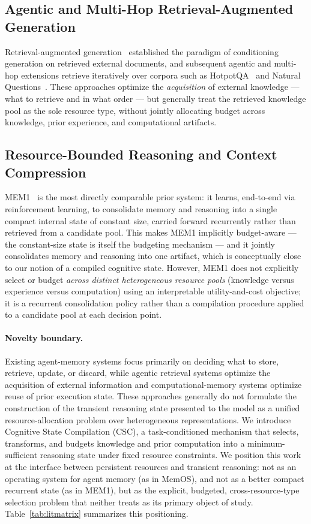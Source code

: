 \documentclass{article}
\begin{document}
\subsection{Agentic and Multi-Hop Retrieval-Augmented Generation}
Retrieval-augmented generation~\citep{lewis2020rag} established the paradigm of conditioning generation on retrieved external documents, and subsequent agentic and multi-hop extensions retrieve iteratively over corpora such as HotpotQA~\citep{yang2018hotpotqa} and Natural Questions~\citep{kwiatkowski2019natural}. These approaches optimize the \emph{acquisition} of external knowledge --- what to retrieve and in what order --- but generally treat the retrieved knowledge pool as the sole resource type, without jointly allocating budget across knowledge, prior experience, and computational artifacts.

\subsection{Resource-Bounded Reasoning and Context Compression}
MEM1~\citep{zhou2025mem1} is the most directly comparable prior system: it learns, end-to-end via reinforcement learning, to consolidate memory and reasoning into a single compact internal state of constant size, carried forward recurrently rather than retrieved from a candidate pool. This makes MEM1 implicitly budget-aware --- the constant-size state is itself the budgeting mechanism --- and it jointly consolidates memory and reasoning into one artifact, which is conceptually close to our notion of a compiled cognitive state. However, MEM1 does not explicitly select or budget \emph{across distinct heterogeneous resource pools} (knowledge versus experience versus computation) using an interpretable utility-and-cost objective; it is a recurrent consolidation policy rather than a compilation procedure applied to a candidate pool at each decision point.

\paragraph{Novelty boundary.} Existing agent-memory systems focus primarily on deciding what to store, retrieve, update, or discard, while agentic retrieval systems optimize the acquisition of external information and computational-memory systems optimize reuse of prior execution state. These approaches generally do not formulate the construction of the transient reasoning state presented to the model as a unified resource-allocation problem over heterogeneous representations. We introduce Cognitive State Compilation (CSC), a task-conditioned mechanism that selects, transforms, and budgets knowledge and prior computation into a minimum-sufficient reasoning state under fixed resource constraints. We position this work at the interface between persistent resources and transient reasoning: not as an operating system for agent memory (as in MemOS), and not as a better compact recurrent state (as in MEM1), but as the explicit, budgeted, cross-resource-type selection problem that neither treats as its primary object of study. Table~\ref{tab:litmatrix} summarizes this positioning.
\end{document}
